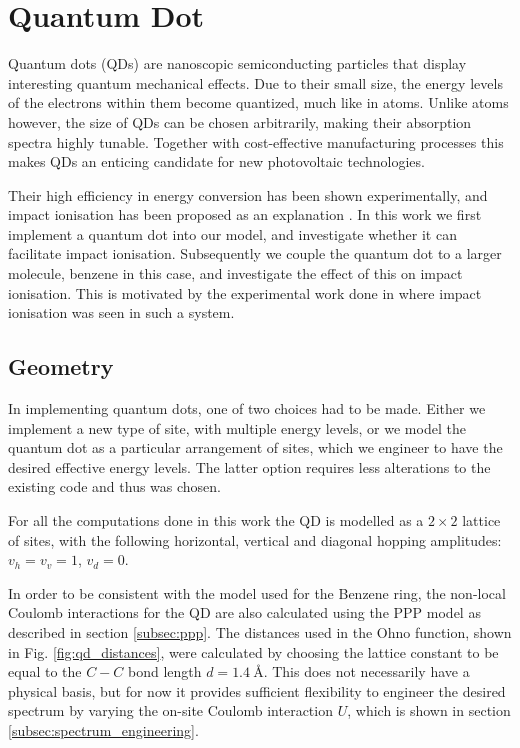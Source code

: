 \section{Quantum Dot}

Quantum dots (QDs) are nanoscopic semiconducting particles that display interesting quantum mechanical effects. Due to their small size, the energy levels of the electrons within them become quantized, much like in atoms. Unlike atoms however, the size of QDs can be chosen arbitrarily, making their absorption spectra highly tunable.  Together with cost-effective manufacturing processes this makes QDs an enticing candidate for new photovoltaic technologies.
\medskip

Their high efficiency in energy conversion has been shown experimentally, and impact ionisation has been proposed as an explanation \cite{impact_io_in_qd}. In this work we first implement a quantum dot into our model, and investigate whether it can facilitate impact ionisation. Subsequently we couple the quantum dot to a larger molecule, benzene in this case, and investigate the effect of this on impact ionisation. This is motivated by the experimental work done in \cite{qd_motivation} where impact ionisation was seen in such a system.

\subsection{Geometry}
 
 In implementing quantum dots, one of two choices had to be made. Either we implement a new type of site, with multiple energy levels, or we model the quantum dot as a particular arrangement of sites, which we engineer to have the desired effective energy levels. The latter option requires less alterations to the existing code and thus was chosen.
 
 \medskip
 
 For all the computations done in this work the QD is modelled as a $2\times 2$ lattice of sites, with the following horizontal, vertical and diagonal hopping amplitudes: $v_h = v_v = 1$, $v_d = 0$.
 
 \medskip
 
 In order to be consistent with the model used for the Benzene ring, the non-local Coulomb interactions for the QD are also calculated using the PPP model as described in section \ref{subsec:ppp}. The distances used in the Ohno function, shown in Fig.
 \ref{fig:qd_distances}, were calculated by choosing the lattice constant to be equal to the $C-C$ bond length $d =\SI{1.4}{\angstrom}$. This does not necessarily have a physical basis, but for now it provides sufficient flexibility to engineer the desired spectrum by varying the on-site Coulomb interaction $U$, which is shown in section \ref{subsec:spectrum_engineering}.
 
